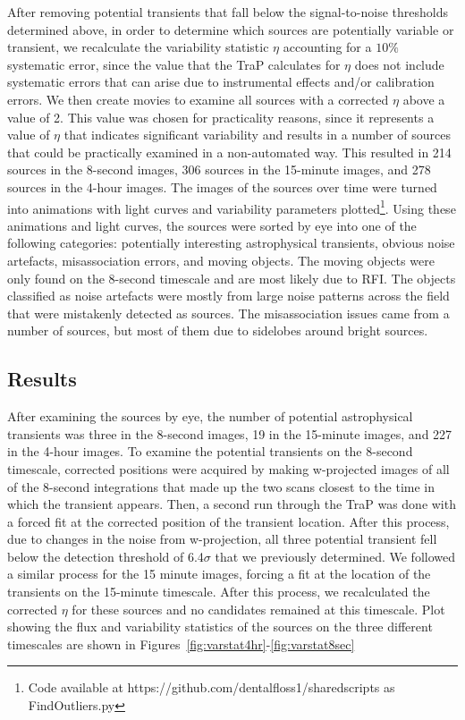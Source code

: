 \documentclass[12pt]{article}
\begin{document}
After removing potential transients that fall below the signal-to-noise thresholds determined above, in order to determine which sources are potentially variable or transient, we recalculate the variability statistic $\eta$ accounting for a $10\%$ systematic error, since the value that the TraP calculates for $\eta$ does not include systematic errors that can arise due to instrumental effects and/or calibration errors. We then create movies to examine all sources with a corrected $\eta$ above a value of 2. This value was chosen for practicality reasons, since it represents a value of $\eta$ that indicates significant variability and results in a number of sources that could be practically examined in a non-automated way. This resulted in 214 sources in the 8-second images, 306 sources in the 15-minute images, and 278 sources in the 4-hour images. The images of the sources over time were turned into animations with light curves and variability parameters plotted\footnote{Code available at https://github.com/dentalfloss1/sharedscripts as FindOutliers.py}. Using these animations and light curves, the sources were sorted by eye into one of the following categories: potentially interesting astrophysical transients, obvious noise artefacts, misassociation errors, and moving objects. The moving objects were only found on the 8-second timescale and are most likely due to RFI. The objects classified as noise artefacts were mostly from large noise patterns across the field that were mistakenly detected as sources. The misassociation issues came from a number of sources, but most of them due to sidelobes around bright sources. 


\subsection{Results}
\label{sec:results2}
After examining the sources by eye, the number of potential astrophysical transients was three in the 8-second images, 19 in the 15-minute images, and 227 in the 4-hour images. To examine the potential transients on the 8-second timescale, corrected positions were acquired by making w-projected images of all of the 8-second integrations that made up the two scans closest to the time in which the transient appears. Then, a second run through the TraP was done with a forced fit at the corrected position of the transient location. After this process, due to changes in the noise from w-projection, all three potential transient fell below the detection threshold of 6.4$\sigma$ that we previously determined. We followed a similar process for the 15 minute images, forcing a fit at the location of the transients on the 15-minute timescale. After this process, we recalculated the corrected $\eta$ for these sources and no candidates remained at this timescale. Plot showing the flux and variability statistics of the sources on the three different timescales are shown in Figures~\ref{fig:varstat4hr}-\ref{fig:varstat8sec}
\end{document}
